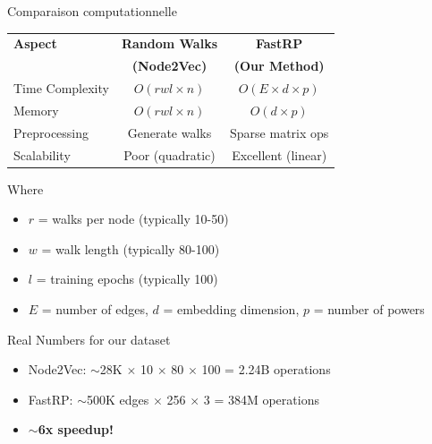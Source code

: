 \documentclass[9pt,aspectratio=169,professionalfonts]{beamer}
\begin{document}
\begin{frame}{Comparaison computationnelle}
\begin{table}
\centering
\begin{tabular}{lcc}
\toprule
\textbf{Aspect} & \textbf{Random Walks} & \textbf{FastRP} \\
& \textbf{(Node2Vec)} & \textbf{(Our Method)} \\
\midrule
Time Complexity & $O(rwl \times n)$ & $O(E \times d \times p)$ \\
Memory & $O(rwl \times n)$ & $O(d \times p)$ \\
Preprocessing & Generate walks & Sparse matrix ops \\
Scalability & Poor (quadratic) & Excellent (linear) \\
\bottomrule
\end{tabular}
\end{table}

\begin{block}{Where}
\begin{itemize}
    \item $r$ = walks per node (typically 10-50)
    \item $w$ = walk length (typically 80-100)  
    \item $l$ = training epochs (typically 100)
    \item $E$ = number of edges, $d$ = embedding dimension, $p$ = number of powers
\end{itemize}
\end{block}

\begin{alertblock}{Real Numbers for our dataset}
\begin{itemize}
    \item Node2Vec: $\sim$28K $\times$ 10 $\times$ 80 $\times$ 100 = 2.24B operations
    \item FastRP: $\sim$500K edges $\times$ 256 $\times$ 3 = 384M operations
    \item \textbf{$\sim$6x speedup!}
\end{itemize}
\end{alertblock}
\end{frame}
\end{document}
